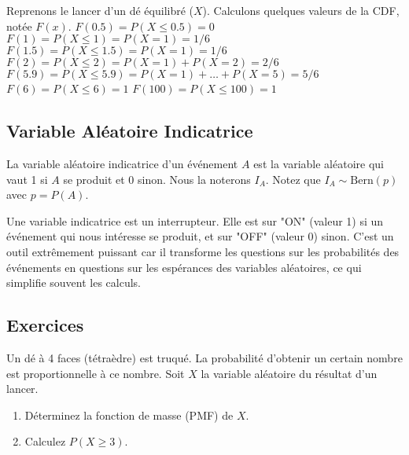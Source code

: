 \begin{examplebox}
Reprenons le lancer d'un dé équilibré ($X$). Calculons quelques valeurs de la CDF, notée $F(x)$.
\newline
$F(0.5) = P(X \le 0.5) = 0$
\newline
$F(1) = P(X \le 1) = P(X=1) = 1/6$
\newline
$F(1.5) = P(X \le 1.5) = P(X=1) = 1/6$
\newline
$F(2) = P(X \le 2) = P(X=1) + P(X=2) = 2/6$
\newline
$F(5.9) = P(X \le 5.9) = P(X=1) + \dots + P(X=5) = 5/6$
\newline
$F(6) = P(X \le 6) = 1$
\newline
$F(100) = P(X \le 100) = 1$
\end{examplebox}

\subsection{Variable Aléatoire Indicatrice}

\begin{definitionbox}
La variable aléatoire indicatrice d'un événement $A$ est la variable aléatoire qui vaut 1 si $A$ se produit et 0 sinon. Nous la noterons $I_A$. Notez que $I_A \sim \text{Bern}(p)$ avec $p=P(A)$.
\end{definitionbox}

\begin{intuitionbox}
Une variable indicatrice est un interrupteur. Elle est sur "ON" (valeur 1) si un événement qui nous intéresse se produit, et sur "OFF" (valeur 0) sinon. C'est un outil extrêmement puissant car il transforme les questions sur les probabilités des événements en questions sur les espérances des variables aléatoires, ce qui simplifie souvent les calculs.
\end{intuitionbox}

\subsection{Exercices}

\begin{exercicebox}
Un dé à 4 faces (tétraèdre) est truqué. La probabilité d'obtenir un certain nombre est proportionnelle à ce nombre. Soit $X$ la variable aléatoire du résultat d'un lancer.
\begin{enumerate}
    \item Déterminez la fonction de masse (PMF) de $X$.
    \item Calculez $P(X \ge 3)$.
\end{enumerate}
\end{exercicebox}

